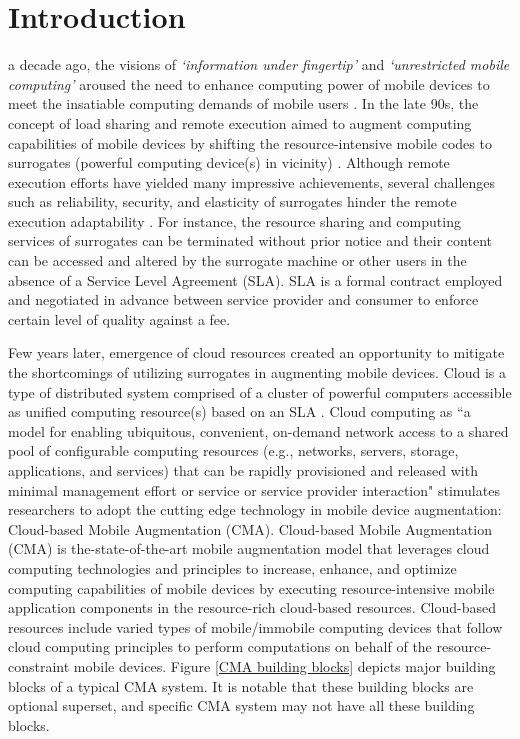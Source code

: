 \documentclass[publish]{IEEEtran}
\begin{document}
\section{Introduction}
 a decade ago, the visions of \textit{`information under fingertip'} \cite{Weiser2002} and \textit{`unrestricted mobile computing'} \cite{Satyanarayanan1997} aroused the need to enhance computing power of mobile devices to meet the insatiable computing demands of mobile users \cite{SaeidAbolfazli2012}. 
In the late 90s, the concept of load sharing and remote execution aimed to augment computing capabilities of mobile devices by shifting the resource-intensive mobile codes to surrogates (powerful computing device(s) in vicinity) \cite{Othman:1998:PCS:584007.584011, Rudenko1998a,Satyanarayanan2001}. Although remote execution efforts \cite{Flinn, Flinnc,Balan2006,Balan2002cyber,Balan, Balana, Goyal2004a,Kristensen,Kristensen2008, Su2005,Gu2003, Kristensen2010} have yielded many impressive achievements, several challenges such as reliability, security, and elasticity of surrogates hinder the remote execution adaptability \cite{Sharifi2011}. For instance, the resource sharing and computing services of surrogates can be terminated without prior notice and their content can be accessed and altered by the surrogate machine or other users in the absence of a Service Level Agreement (SLA). SLA is a formal contract employed and negotiated in advance between service provider and consumer to enforce certain level of quality against a fee. 

Few years later, emergence of cloud resources created an opportunity to mitigate the shortcomings of utilizing surrogates in augmenting mobile devices. Cloud is a type of distributed system comprised of a cluster of powerful computers accessible as unified computing resource(s) based on an SLA \cite{buyya2009cloud}. Cloud computing as ``a model for enabling ubiquitous, convenient, on-demand network access to a shared pool of configurable computing resources (e.g., networks, servers, storage, applications, and services) that can be rapidly provisioned and released with minimal management effort or service or service provider interaction" \cite{Mell2011} stimulates researchers to adopt the cutting edge technology in mobile device augmentation: Cloud-based Mobile Augmentation (CMA). Cloud-based Mobile Augmentation (CMA) is the-state-of-the-art mobile augmentation model that leverages cloud computing technologies and principles to increase, enhance, and optimize computing capabilities of mobile devices by executing resource-intensive mobile application components in the resource-rich cloud-based resources. Cloud-based resources include varied types of mobile/immobile computing devices that follow cloud computing principles \cite{Buyya2010, HoganJuly2011} to perform computations on behalf of the resource-constraint mobile devices. Figure \ref{CMA building blocks} depicts major building blocks of a typical CMA system. It is notable that these building blocks are optional superset, and specific CMA system may not have all these building blocks.
\end{document}
